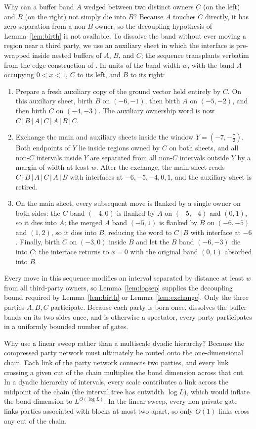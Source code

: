 \begin{inwords}
Why can a buffer band $A$ wedged between two distinct owners $C$ (on the
left) and $B$ (on the right) not simply die into $B$? Because $A$ touches
$C$ directly, it has zero separation from a non-$B$ owner, so the
decoupling hypothesis of Lemma~\ref{lem:birth} is not available. To dissolve the band without
ever moving a region near a third party, we use an auxiliary sheet \cite{PP}
in which the interface is pre-wrapped inside nested buffers of $A$, $B$, and
$C$; the sequence transplants verbatim from the edge construction of
\cite{PP}. In units of the band width $w$, with the band $A$ occupying $0<x<1$,
$C$ to its left, and $B$ to its right:
\begin{enumerate}[leftmargin=2em,itemsep=0pt]
\item Prepare a fresh auxiliary copy of the ground vector held entirely by
$C$. On this auxiliary sheet, birth $B$ on $(-6,-1)$, then birth $A$ on
$(-5,-2)$, and then birth $C$ on $(-4,-3)$. The auxiliary ownership word is
now $C\,|\,B\,|\,A\,|\,C\,|\,A\,|\,B\,|\,C$.
\item Exchange the main and auxiliary sheets inside the window
$Y=(-7,-\tfrac72)$. Both endpoints of $Y$ lie inside regions owned by $C$ on
both sheets, and all non-$C$ intervals inside $Y$ are separated from all
non-$C$ intervals outside $Y$ by a margin of width at least $w$. After the
exchange, the main sheet reads $C\,|\,B\,|\,A\,|\,C\,|\,A\,|\,B$ with
interfaces at $-6,-5,-4,0,1$, and the auxiliary sheet is retired.
\item On the main sheet, every subsequent move is flanked by a single owner
on both sides: the $C$ band $(-4,0)$ is flanked by $A$ on $(-5,-4)$ and
$(0,1)$, so it dies into $A$; the merged $A$ band $(-5,1)$ is flanked by $B$
on $(-6,-5)$ and $(1,2)$, so it dies into $B$, reducing the word to $C\,|\,B$
with interface at $-6$. Finally, birth $C$ on $(-3,0)$ inside $B$ and let
the $B$ band $(-6,-3)$ die into $C$: the interface returns to $x=0$ with the
original band $(0,1)$ absorbed into $B$.
\end{enumerate}
Every move in this sequence modifies an interval separated by distance at
least $w$ from all third-party owners, so Lemma~\ref{lem:logsep} supplies
the decoupling bound required by Lemma~\ref{lem:birth} or
Lemma~\ref{lem:exchange}. Only the three parties $A,B,C$ participate. Because
each party is born once, dissolves the buffer bands on its two sides once,
and is otherwise a spectator, every party participates in a uniformly bounded
number of gates.

Why use a linear sweep rather than a multiscale dyadic hierarchy? Because
the compressed party network must ultimately be routed onto the
one-dimensional chain. Each link of the party network connects two parties,
and every link crossing a given cut of the chain multiplies the bond
dimension across that cut. In a dyadic hierarchy of intervals, every scale
contributes a link across the midpoint of the chain (the interval tree has
cutwidth $\log L$), which would inflate the bond dimension to
$L^{O(\log L)}$. In the linear sweep, every non-private gate links parties
associated with blocks at most two apart, so only $O(1)$ links cross any cut
of the chain.
\end{inwords}

